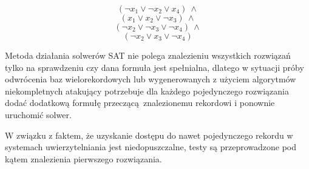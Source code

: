 \[ (\neg x_1 \lor \neg x_2 \lor x_4)~\land \]\[  (x_1 \lor x_2 \lor \neg x_3)~\land \]\[ (\neg x_2 \lor \neg x_3 \lor \neg x_4)~\land \]\[(\neg x_2 \lor x_3 \lor \neg x_4) \]


Metoda działania solwerów SAT nie polega znalezieniu wszystkich rozwiązań tylko na sprawdzeniu czy dana formuła jest spełnialna, 
dlatego w sytuacji próby odwrócenia baz wielorekordowych lub wygenerowanych z użyciem algorytmów niekompletnych atakujący potrzebuje dla każdego pojedynczego rozwiązania dodać dodatkową formułę przeczącą znalezionemu rekordowi i ponownie uruchomić solwer.   

W związku z faktem, że uzyskanie dostępu do nawet pojedynczego rekordu w systemach uwierzytelniania jest niedopuszczalne, testy są przeprowadzone pod kątem znalezienia pierwszego rozwiązania. 